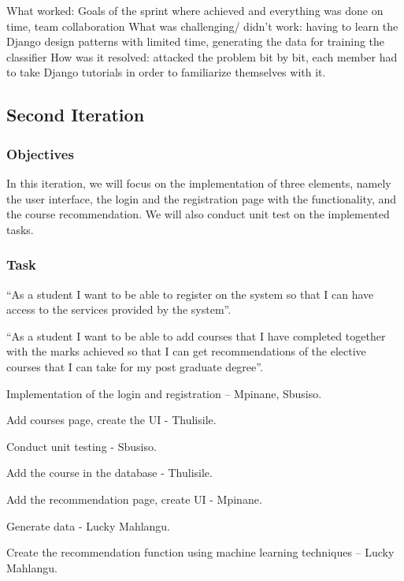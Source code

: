 \documentclass[10pt]{article}
\begin{document}
What worked: Goals of the sprint where achieved and everything was done on time, team collaboration
What was challenging/ didn’t work:  having to learn the Django design patterns with limited time, generating the data for training the classifier 
How was it resolved: attacked the problem bit by bit, each member had to take Django tutorials in order to familiarize themselves with it.

\subsection{Second Iteration}

\subsubsection{Objectives}

In this iteration, we will focus on the implementation of three elements, namely the user interface, the login and the registration page with the functionality, and the course recommendation. We will also conduct unit test on the implemented tasks.

\subsubsection{Task}

“As a student I want to be able to register on the system so that I can have access to the services provided by the system”.

“As a student I want to be able to add courses that I have completed together with the marks achieved so that I can get recommendations of the elective courses that I can take for my post graduate degree”.

\begin{description}[font=$\bullet$~\normalfont\scshape\color{red!50!black}]

\item [] Implementation of the login and registration – Mpinane, Sbusiso.
\item [] Add courses page, create the UI - Thulisile.
\item [] Conduct unit testing - Sbusiso.
\item [] Add the course in the database - Thulisile.
\item [] Add the recommendation page, create UI - Mpinane.
\item [] Generate data - Lucky Mahlangu.
\item [] Create the recommendation function using machine learning techniques – Lucky Mahlangu.
\end{description}
\end{document}
